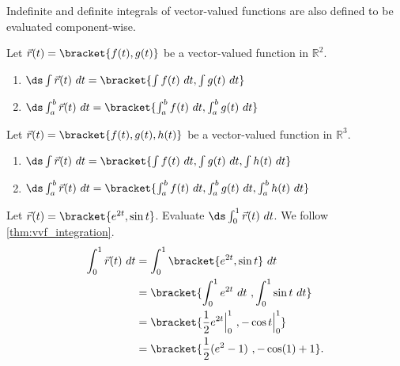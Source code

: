 Indefinite and definite integrals of vector-valued functions are also defined to be evaluated component-wise.

\begin{definition}\label{thm:vvf_integration}
Let $\vec r(t) =\bracket{f(t),g(t)}$ be a vector-valued function in $\mathbb{R}^2$.
\begin{enumerate}
	\item $\ds \int \vec r(t)\ dt =\bracket{\int f(t)\ dt, \int g(t)\ dt}$
	\item	$\ds \int_a^b \vec r(t)\ dt =\bracket{\int_a^b f(t)\ dt, \int_a^b g(t)\ dt}$
\end{enumerate}
Let $\vec r(t) =\bracket{f(t),g(t),h(t)}$ be a vector-valued function in $\mathbb{R}^3$.
\begin{enumerate}
	\item $\ds \int \vec r(t)\ dt =\bracket{\int f(t)\ dt, \int g(t)\ dt, \int h(t)\ dt}$
	\item	$\ds \int_a^b \vec r(t)\ dt =\bracket{\int_a^b f(t)\ dt, \int_a^b g(t)\ dt, \int_a^b h(t)\ dt}$
\end{enumerate}
\end{definition}

\begin{example}\label{ex_vvfint1}
Let $\vec r(t) =\bracket{e^{2t},\sin t}$. Evaluate $\ds \int_0^1 \vec r(t) \ dt$.
\solution
We follow \autoref{thm:vvf_integration}.
\begin{align*}
\int_0^1 \vec r(t) \ dt &= \int_0^1\bracket{e^{2t},\sin t}\ dt \\
				&=\bracket{\int_0^1 e^{2t}\ dt\ , \int_0^1 \sin t \ dt}\\
				&=\bracket{\frac12e^{2t}\Big|_0^1\ , -\cos t\Big|_0^1}\\
				&=\bracket{\frac12(e^2-1)\ , -\cos(1)+1}
				.
\end{align*}
\end{example}

